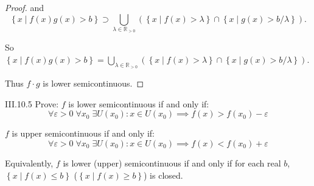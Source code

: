 \begin{proof}
    and
    \[
        \left\{ x \mid f(x)g(x) > b \right\} \supset \bigcup_{\lambda \in \mathbb{R}_{> 0}} (\left\{ x \mid f(x) > \lambda \right\} \cap \left\{ x \mid g(x) > b/\lambda \right\}).
    \]

    So \( \left\{ x \mid f(x)g(x) > b \right\} = \bigcup_{\lambda \in \mathbb{R}_{> 0}} (\left\{ x \mid f(x) > \lambda \right\} \cap \left\{ x \mid g(x) > b/\lambda \right\}) \).

    Thus \( f\cdot g \) is lower semicontinuous.
\end{proof}

\begin{problem}{III.10.5}
Prove: \(f\) is lower semicontinuous if and only if:
\[
    \forall \varepsilon > 0\; \forall x_{0}\; \exists U(x_{0}): x \in U(x_{0}) \implies f(x) > f(x_{0}) - \varepsilon
\]

\(f\) is upper semicontinuous if and only if:
\[
    \forall \varepsilon > 0\; \forall x_{0}\; \exists U(x_{0}): x \in U(x_{0}) \implies f(x) < f(x_{0}) + \varepsilon
\]

Equivalently, \(f\) is lower (upper) semicontinuous if and only if for each real \(b\), \( \left\{ x \mid f(x) \le b \right\} \) (\( \left\{ x \mid f(x) \ge b \right\} \)) is closed.
\end{problem}

